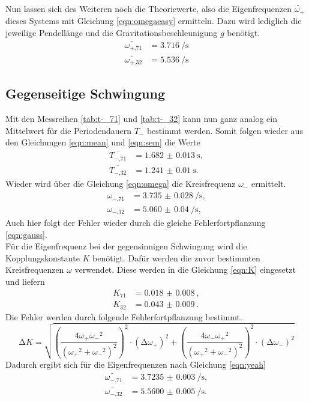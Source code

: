 Nun lassen sich des Weiteren noch die Theoriewerte, also die Eigenfrequenzen $\widetilde{\omega_{+}}$ dieses Systems mit Gleichung \eqref{eqn:omegaeasy} ermitteln. Dazu wird lediglich die jeweilige Pendellänge und die Gravitationsbeschleunigung $g$ \cite{naturkonstanten} benötigt.
\begin{align*}
    \widetilde{\omega_{+\text{,}71}} &= \SI{3.716}{\per\second} \\
    \widetilde{\omega_{+\text{,}32}} &=  \SI{5.536}{\per\second}
\end{align*}

\subsection{Gegenseitige Schwingung}
Mit den Messreihen \ref{tab:t-_71} und \ref{tab:t-_32} kann nun ganz analog ein Mittelwert für die Periodendauern $T_{-}$ bestimmt werden. Somit folgen wieder aus den Gleichungen \eqref{eqn:mean} und \eqref{eqn:sem} die Werte
\begin{align*}
    \overline{T_{-\text{,}71}} &= \SI{1.682(13)}{\second}, \\
    \overline{T_{-\text{,}32}} &= \SI{1.241(10)}{\second}.
\end{align*}
Wieder wird über die Gleichung \eqref{eqn:omega} die Kreisfrequenz $\omega_{-}$ ermittelt.
\begin{align*}
    \omega_{-\text{,}71} &= \SI{3.735(28)}{\per\second}, \\
    \omega_{-\text{,}32} &= \SI{5.060(40)}{\per\second}, 
\end{align*}
Auch hier folgt der Fehler wieder durch die gleiche Fehlerfortpflanzung \eqref{eqn:gauss}.
\\
Für die Eigenfrequenz bei der gegensinnigen Schwingung wird die Kopplungskonstante $K$ benötigt. Dafür werden die zuvor bestimmten Kreisfrequenzen $\omega$ verwendet.
Diese werden in die Gleichung \eqref{eqn:K} eingesetzt und liefern
\begin{align*}
K_{71} &= \SI{0.018(8)}{}, \\
K_{32} &= \SI{0.043(9)}{}.
\end{align*}
Die Fehler werden durch folgende Fehlerfortpflanzung bestimmt.
\begin{equation*}
\increment K = \sqrt{\left(\frac{4{\omega_{+}} {\omega_{-}}^2}{({\omega_{+}}^2 + {\omega_{-}}^2)^2}\right)^2 \cdot (\increment {\omega_{+}})^2 + \left(\frac{4{\omega_{-}} {\omega_{+}}^2}{({\omega_{+}}^2 + {\omega_{-}}^2)^2}\right)^2 \cdot (\increment {\omega_{-}})^2}
\end{equation*}
Dadurch ergibt sich für die Eigenfrequenzen nach Gleichung \eqref{eqn:yeah}
\begin{align*}
    \widetilde{\omega_{-\text{,}71}} &= \SI{3.7235(30)}{\per\second}, \\
    \widetilde{\omega_{-\text{,}32}} &=  \SI{5.5600(50)}{\per\second}.
\end{align*}

